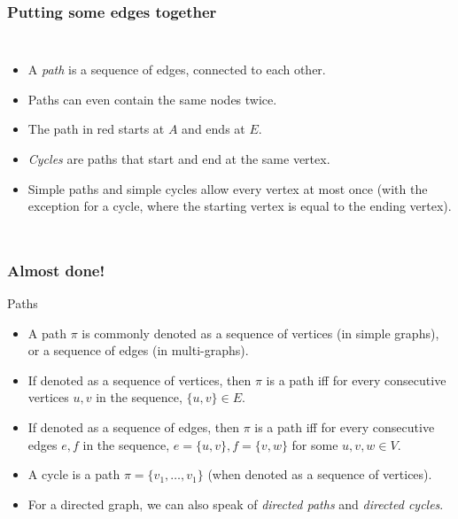 \begin{frame}
	\frametitle{Putting some edges together}
	\begin{columns}
			
		\begin{itemize}
			\item A \textit{path} is a sequence of edges, connected to each other.
				\pause
			\item Paths can even contain the same nodes twice.
			\item The path in \alert{red} starts at $A$ and ends at $E$.
				\pause
			\item \textit{Cycles} are paths that start and end at the same vertex.
				\pause
			\item Simple paths and simple cycles allow every vertex at most once (with the exception for a cycle, where the
				starting vertex is equal to the ending vertex).
		\end{itemize}
	\end{columns}
\end{frame}

\begin{frame}
	\frametitle{Almost done!}
	\begin{block}{Paths}
		\begin{itemize}
			\item A path $\pi$ is commonly denoted as a sequence of vertices (in simple graphs), or a sequence of edges (in
				multi-graphs).
				\pause
			\item If denoted as a sequence of vertices, then $\pi$ is a path iff for every consecutive vertices $u,v$ in the
				sequence, $\{u,v\} \in E$.
				\pause
			\item If denoted as a sequence of edges, then $\pi$ is a path iff for every consecutive edges $e,f$ in the
				sequence, $e=\{u,v\}, f=\{v,w\}$ for some $u,v,w \in V$.
				\pause
			\item A cycle is a path $\pi = \{v_1, \dots, v_1\}$ (when denoted as a sequence of vertices).
				\pause
			\item For a directed graph, we can also speak of \textit{directed paths} and \textit{directed cycles}.
		\end{itemize}
	\end{block}	
\end{frame}

